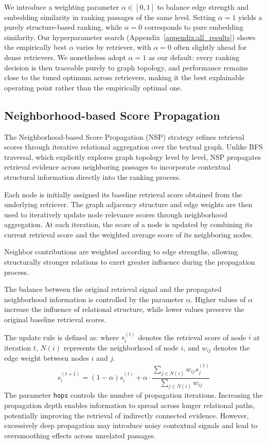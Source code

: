 \documentclass[11pt]{article}
\begin{document}
We introduce a weighting parameter $\alpha \in [0,1]$ to balance edge strength and embedding similarity in ranking passages of the same level. Setting $\alpha = 1$ yields a purely structure-based ranking, while $\alpha = 0$ corresponds to pure embedding similarity. Our hyperparameter search (Appendix~\ref{appendix:all_results}) shows the empirically best $\alpha$ varies by retriever, with $\alpha = 0$ often slightly ahead for dense retrievers. We nonetheless adopt $\alpha = 1$ as our default: every ranking decision is then traceable purely to graph topology, and performance remains close to the tuned optimum across retrievers, making it the best explainable operating point rather than the empirically optimal one.

\subsection{Neighborhood-based Score Propagation}\label{section:NSP}

The Neighborhood-based Score Propagation (NSP) strategy refines retrieval scores through iterative relational aggregation over the textual graph. Unlike BFS traversal, which explicitly explores graph topology level by level, NSP propagates retrieval evidence across neighboring passages to incorporate contextual structural information directly into the ranking process.

Each node is initially assigned its baseline retrieval score obtained from the underlying retriever. The graph adjacency structure and edge weights are then used to iteratively update node relevance scores through neighborhood aggregation. At each iteration, the score of a node is updated by combining its current retrieval score and the weighted average score of its neighboring nodes.

Neighbor contributions are weighted according to edge strengths, allowing structurally stronger relations to exert greater influence during the propagation process.

The balance between the original retrieval signal and the propagated neighborhood information is controlled by the parameter $\alpha$. Higher values of $\alpha$ increase the influence of relational structure, while lower values preserve the original baseline retrieval scores.

The update rule is defined as: where $s_i^{(t)}$ denotes the retrieval score of node $i$ at iteration $t$, $N(i)$ represents the neighborhood of node $i$, and $w_{ij}$ denotes the edge weight between nodes $i$ and $j$.
\[
s_i^{(t+1)} = (1-\alpha)s_i^{(t)} +
\alpha \cdot
\frac{
\sum_{j \in N(i)} w_{ij}s_j^{(t)}
}{
\sum_{j \in N(i)} w_{ij}
}
\]
The parameter \texttt{hops} controls the number of propagation iterations. Increasing the propagation depth enables information to spread across longer relational paths, potentially improving the retrieval of indirectly connected evidence. However, excessively deep propagation may introduce noisy contextual signals and lead to oversmoothing effects across unrelated passages.
\end{document}
